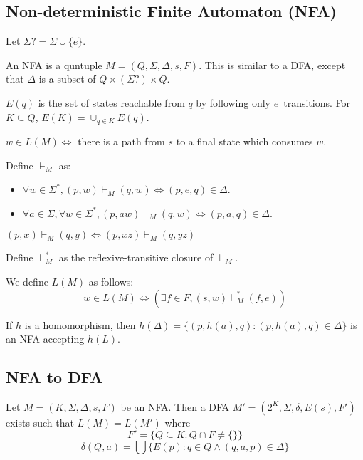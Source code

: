 \subsection[NFA]{Non-deterministic Finite Automaton (NFA)}

Let $\Sigma? = \Sigma \cup \{e\}$.

An NFA is a quntuple $M = (Q, \Sigma, \Delta, s, F)$.
This is similar to a DFA, except that $\Delta$ is a subset of $Q \times (\Sigma?) \times Q$.

$E(q)$ is the set of states reachable from $q$ by following only $e$~transitions.
For $K \subseteq Q$, $E(K) = \cup_{q \in K} E(q)$.

$w \in L(M) \iff$ there is a path from $s$ to a final state which consumes $w$.

Define $\vdash_M$ as:
\begin{itemize}
\item $\forall w \in \Sigma^*, (p, w) \vdash_M (q, w) \iff (p, e, q) \in \Delta$.
\item $\forall a \in \Sigma, \forall w \in \Sigma^*, (p, aw) \vdash_M (q, w) \iff (p, a, q) \in \Delta$.
\end{itemize}

\begin{theorem}$(p, x) \vdash_M (q, y) \iff (p, xz) \vdash_M (q, yz)$\end{theorem}

Define $\vdash_M^*$ as the reflexive-transitive closure of $\vdash_M$.

We define $L(M)$ as follows:
\[ w \in L(M) \iff (\exists f \in F, (s, w) \vdash_M^* (f, e)) \]

\begin{theorem}
If $h$ is a homomorphism, then $h(\Delta) = \{(p, h(a), q): (p, h(a), q) \in \Delta \}$
is an NFA accepting $h(L)$.
\end{theorem}

\subsection{NFA to DFA}

\begin{theorem}
Let $M = (K, \Sigma, \Delta, s, F)$ be an NFA.
Then a DFA $M' = (2^K, \Sigma, \delta, E(s), F')$ exists such that $L(M) = L(M')$ where
\[ F' = \{Q \subseteq K: Q \cap F \neq \{\}\} \]
\[ \delta(Q, a) = \bigcup \{E(p): q \in Q \wedge (q, a, p) \in \Delta \} \]
\end{theorem}

